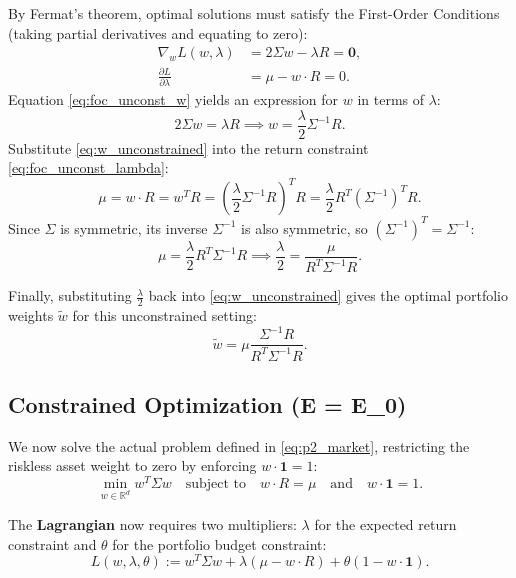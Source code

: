 By Fermat's theorem, optimal solutions must satisfy the First-Order Conditions (taking partial derivatives and equating to zero):
\begin{align}
    \nabla_w L(w, \lambda) &= 2\Sigma w - \lambda R = \mathbf{0}, \label{eq:foc_unconst_w} \\
    \frac{\partial L}{\partial \lambda} &= \mu - w \cdot R = 0. \label{eq:foc_unconst_lambda}
\end{align}
Equation \eqref{eq:foc_unconst_w} yields an expression for $w$ in terms of $\lambda$:
\begin{equation}
    2\Sigma w = \lambda R \implies w = \frac{\lambda}{2} \Sigma^{-1} R. \label{eq:w_unconstrained}
\end{equation}
Substitute \eqref{eq:w_unconstrained} into the return constraint \eqref{eq:foc_unconst_lambda}:
\begin{equation*}
    \mu = w \cdot R = w^T R = \left( \frac{\lambda}{2} \Sigma^{-1} R \right)^T R = \frac{\lambda}{2} R^T (\Sigma^{-1})^T R.
\end{equation*}
Since $\Sigma$ is symmetric, its inverse $\Sigma^{-1}$ is also symmetric, so $(\Sigma^{-1})^T = \Sigma^{-1}$:
\begin{equation}
    \mu = \frac{\lambda}{2} R^T \Sigma^{-1} R \implies \frac{\lambda}{2} = \frac{\mu}{R^T \Sigma^{-1} R}.
\end{equation}

Finally, substituting $\frac{\lambda}{2}$ back into \eqref{eq:w_unconstrained} gives the optimal portfolio weights $\tilde{w}$ for this unconstrained setting:
\begin{equation}
    \tilde{w} = \mu \frac{\Sigma^{-1} R}{R^T \Sigma^{-1} R}.
\end{equation}

\subsection{Constrained Optimization (E = E\_0)}
We now solve the actual problem defined in \eqref{eq:p2_market}, restricting the riskless asset weight to zero by enforcing $w \cdot \mathbf{1} = 1$:
\begin{equation}
    \min_{w \in \mathbb{R}^d} w^T \Sigma w \quad \text{subject to} \quad w \cdot R = \mu \quad \text{and} \quad w \cdot \mathbf{1} = 1.
\end{equation}

The \textbf{Lagrangian} now requires two multipliers: $\lambda$ for the expected return constraint and $\theta$ for the portfolio budget constraint:
\begin{equation}
    L(w, \lambda, \theta) := w^T \Sigma w + \lambda(\mu - w \cdot R) + \theta(1 - w \cdot \mathbf{1}).
\end{equation}

